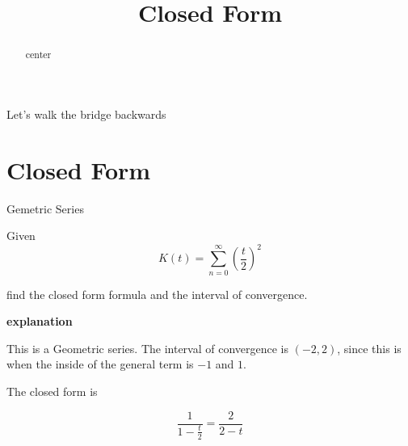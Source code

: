 \documentclass{ximera}
\title{Closed Form}
\begin{document}
\begin{abstract}
center
\end{abstract}
\maketitle






Let's walk the bridge backwards



\section{Closed Form}



\begin{example} Gemetric Series


Given 
\[    K(t) =   \sum_{n=0}^{\infty}  \left( \frac{t}{2} \right)^2\]

find the closed form formula and the interval of convergence.




\textbf{\textcolor{purple!50!blue!90!black}{explanation}}


This is a Geometric series.  The interval of convergence is $(-2, 2)$, since this is when the inside of the general term is $-1$ and $1$.


The closed form is

\[  \frac{1}{1 - \frac{t}{2}}  =     \frac{2}{2-t}           \]






\end{example}
\end{document}
